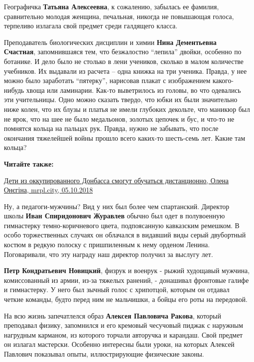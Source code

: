 Географичка \textbf{Татьяна Алексеевна}, к сожалению, забылась ее фамилия, сравнительно
молодая женщина, печальная, никогда не повышающая голоса, терпеливо излагала
свой предмет среди галдящего класса. 

Преподаватель биологических дисциплин и химии \textbf{Нина Дементьевна Счастная},
запомнившаяся тем, что безжалостно \enquote{лепила} двойки,  особенно по ботанике. И
дело было не столько в лени учеников, сколько в малом количестве учебников. Их
выдавали из расчета – одна книжка на три ученика. Правда, у нее можно было
заработать \enquote{пятерку}, нарисовав плакат с изображением какого-нибудь хвоща или
ламинарии. Как-то выветрилось из головы, во что одевались эти учительницы. Одно
можно сказать твердо, что юбки их были значительно ниже колен, что их блузы и
платья не имели глубоких декольте, что маникюр был не ярок, что на шее не было
медальонов, золотых цепочек и бус, и что-то не помнятся кольца на пальцах  рук.
Правда, нужно не забывать, что после окончания тяжелейшей войны прошло всего
каких-то шесть-семь лет. Какие там кольца?

\textbf{Читайте также:} 

\href{https://mrpl.city/news/view/deti-iz-okkupirovannogo-donbassa-smogut-obuchatsya-distantsionno}{Дети из оккупированного Донбасса смогут обучаться дистанционно, Олена Онєгіна, mrpl.city, 05.10.2018}

Ну, а педагоги-мужчины? Вид у них был более чем спартанский. Директор школы
\textbf{Иван Спиридонович Журавлев} обычно был одет в полувоенную гимнастерку
темно-коричневого цвета, подпоясанную кавказским ремешком. В особо
торжественных случаях он облачался  в видавший виды серый двубортный костюм в
редкую полоску с пришпиленным к нему орденом Ленина. Поговаривали, что эту
награду наш директор получил за выслугу лет.

\textbf{Петр Кондратьевич Новицкий}, физрук и военрук  - рыжий худощавый  мужчина,
комиссованный из армии, из-за тяжелых ранений, - донашивал фронтовые галифе и
гимнастерку. У него был зычный голос с хрипотцой, которым он отдавал четкие
команды, будто перед ним не мальчишки, а бойцы его роты на передовой.


На всю жизнь запечатлелся образ \textbf{Алексея Павловича Ракова}, который преподавал
физику, запомнился и его кремовый чесучовый пиджак с наружным нагрудным
карманом, из которого торчали авторучка и карандаш. Свой предмет он излагал
мастерски. Особенно интересны были уроки, на которых Алексей Павлович показывал
опыты, иллюстрирующие физические законы.

